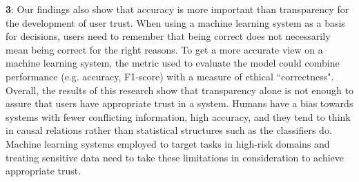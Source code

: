 \textbf{3}: Our findings also show that accuracy is more important than transparency for the development of user trust. When using a machine learning system as a basis for decisions, users need to remember that being correct does not necessarily mean being correct for the right reasons. To get a more accurate view on a machine learning system, the metric used to evaluate the model could combine performance (e.g. accuracy, F1-score) with a measure of ethical ``correctness".\medskip \newline
Overall, the results of this research show that transparency alone is not enough to assure that users have appropriate trust in a system. Humans have a bias towards systems with fewer conflicting information, high accuracy, and they tend to think in causal relations rather than statistical structures such as the classifiers do. Machine learning systems employed to target tasks in high-risk domains and treating sensitive data need to take these limitations in consideration to achieve appropriate trust.


